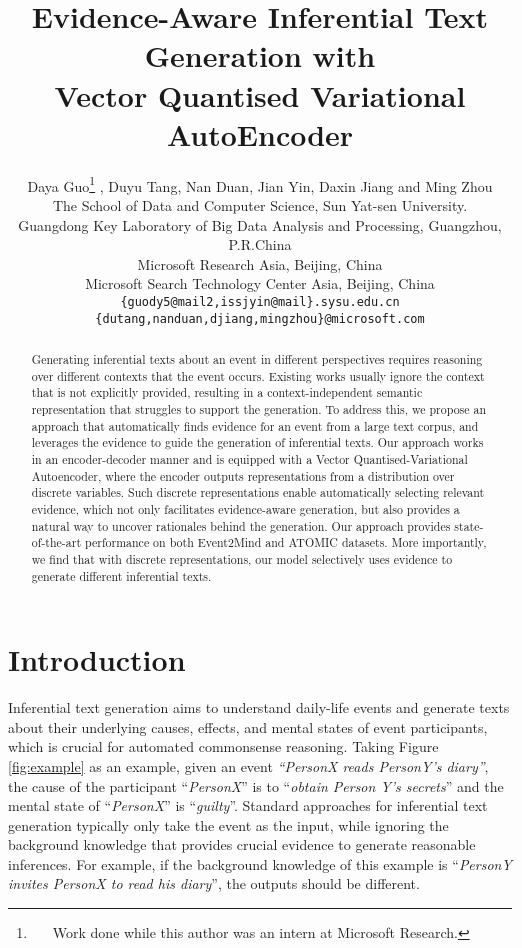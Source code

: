 \documentclass[11pt,a4paper]{article}
\title{
Evidence-Aware Inferential Text Generation with \\Vector Quantised Variational AutoEncoder 
}
\author{Daya Guo\thanks{\ \ \ Work done while this author was an intern at Microsoft Research.} , Duyu Tang, Nan Duan, Jian Yin, Daxin Jiang and Ming Zhou\\
	 The School of Data and Computer Science, Sun Yat-sen University.\\
	Guangdong Key Laboratory of Big Data Analysis and Processing, Guangzhou, P.R.China\\
	 Microsoft Research Asia, Beijing, China \\
	 Microsoft Search Technology Center Asia, Beijing, China \\
	{\tt \{guody5@mail2,issjyin@mail\}.sysu.edu.cn}\\
	{\tt \{dutang,nanduan,djiang,mingzhou\}@microsoft.com}\\
}
\date{}
\begin{document}
\maketitle
\begin{abstract}



Generating inferential texts about an event in different perspectives requires reasoning over different contexts that the event occurs.
Existing works usually ignore the context that is not explicitly provided, resulting in a context-independent semantic representation that struggles to support the generation. 
To address this, we propose an approach that 
automatically \mbox{finds} evidence for an event from a large text corpus, and leverages the evidence to guide the generation of inferential texts. 
Our approach works in an encoder-decoder manner and is equipped with  a Vector Quantised-Variational Autoencoder, where the encoder outputs representations from a distribution over discrete variables. 
Such discrete representations 
enable automatically selecting relevant evidence, which not only facilitates evidence-aware generation, but also provides a natural way to uncover rationales behind the generation.
Our approach provides state-of-the-art performance on both Event2Mind and ATOMIC datasets.
More importantly, we find that with discrete representations, our model 
\mbox{selectively} uses  evidence to generate different inferential texts.










\end{abstract}

\section{Introduction}
Inferential text generation aims to understand daily-life events and generate texts about their underlying causes, effects, and mental states of event participants, which is crucial for automated commonsense reasoning. 
Taking Figure \ref{fig:example} as an example, given an event \textit{``PersonX reads PersonY's diary''}, the cause of the participant ``\textit{PersonX}'' is to ``\textit{obtain Person Y's secrets}'' and the mental state of ``\textit{PersonX}'' is ``\textit{guilty}''. 
Standard approaches for inferential text generation \cite{rashkin2018event2mind,sap2019atomic,Bosselut2019COMETCT,du2019modeling} typically only take the event as the input, while ignoring the background knowledge that provides crucial evidence to generate reasonable inferences. 
For example, if the background knowledge of this example is ``\textit{PersonY invites PersonX to read his diary}'', the outputs should be different.
\end{document}
